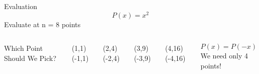 \documentclass{beamer}
\begin{document}
		\begin{frame}{Evaluation}
                \centering		
                    \begin{equation*}
    			    P(x) = x^2
    			\end{equation*}
                    Evaluate at n = 8 points
                \begin{columns}
                    Which Point Should We Pick?

                    \begin{columns}
                         (1,1)
                         (-1,1)
                    \end{columns}
                    \begin{columns}
                         (2,4)
                         (-2,4)
                    \end{columns}
                    \begin{columns}
                         (3,9)
                         (-3,9)
                    \end{columns}
                    \begin{columns}
                         (4,16)
                         (-4,16)
                    \end{columns}

                    \begin{equation*}
                        P(x) = P(-x)
                    \end{equation*}
                    We need only 4 points!
     
        

                \end{columns}
		\end{frame}
            
\end{document}

